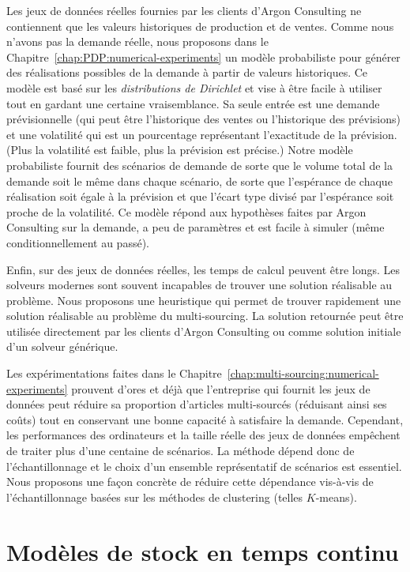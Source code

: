 Les jeux de données réelles fournies par les clients d'Argon Consulting ne contiennent que les valeurs historiques de production et de ventes.
Comme nous n'avons pas la demande réelle, nous proposons dans le Chapitre~\ref{chap:PDP:numerical-experiments} un modèle probabiliste pour générer des réalisations possibles de la demande à partir de valeurs historiques.
Ce modèle est basé sur les \emph{distributions de Dirichlet} et vise à être facile à utiliser tout en gardant une certaine vraisemblance.
Sa seule entrée est une demande prévisionnelle (qui peut être l'historique des ventes ou l'historique des prévisions) et une volatilité qui est un pourcentage représentant l'exactitude de la prévision.
(Plus la volatilité est faible, plus la prévision est précise.)
Notre modèle probabiliste fournit des scénarios de demande de sorte que le volume total de la demande soit le même dans chaque scénario, de sorte que l'espérance de chaque réalisation soit égale à la prévision et que l'écart type divisé par l'espérance soit proche de la volatilité.
Ce modèle répond aux hypothèses faites par Argon Consulting sur la demande, a peu de paramètres et est facile à simuler (même conditionnellement au passé).


\medskip


Enfin, sur des jeux de données réelles, les temps de calcul peuvent être longs.
Les solveurs modernes sont souvent incapables de trouver une solution réalisable au problème.
Nous proposons une heuristique qui permet de trouver rapidement une solution réalisable au problème du multi-sourcing.
La solution retournée peut être utilisée directement par les clients d'Argon Consulting ou comme solution initiale d'un solveur générique.


\medskip


Les expérimentations faites dans le Chapitre~\ref{chap:multi-sourcing:numerical-experiments} prouvent d'ores et déjà que l'entreprise qui fournit les jeux de données peut réduire sa proportion d'articles multi-sourcés (réduisant ainsi ses coûts) tout en conservant une bonne capacité à satisfaire la demande.
Cependant, les performances des ordinateurs et la taille réelle des jeux de données empêchent de traiter plus d'une centaine de scénarios.
La méthode dépend donc de l'échantillonnage et le choix d'un ensemble représentatif de scénarios est essentiel.
Nous proposons une façon concrète de réduire cette dépendance vis-à-vis de l'échantillonnage basées sur les méthodes de clustering (telles $K$-means).


\section{Modèles de stock en temps continu}
\label{sec:intro:fr:continuous-time-inventory-models}



